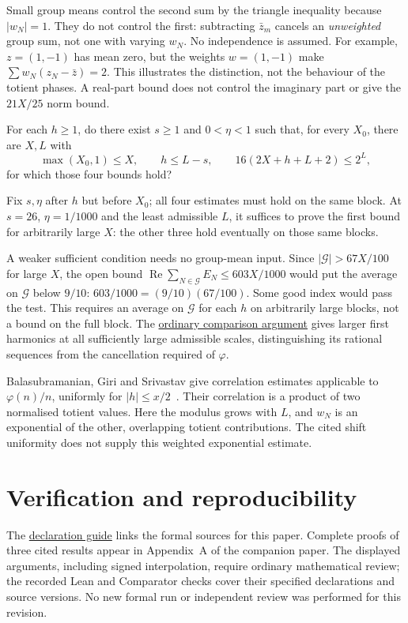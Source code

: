 \documentclass[11pt]{article}
\newcommand{\longrecord}[2]{\href{erdos249-totient-reasoning-surface.pdf\##1}{#2}}
\begin{document}
Small group means control the second sum by the triangle inequality
because $|w_N|=1$. They do not control the first: subtracting
$\bar z_m$ cancels an \emph{unweighted} group sum, not one with
varying $w_N$. No independence is assumed.
For example, $z=(1,-1)$ has mean zero, but the weights
$w=(1,-1)$ make $\sum w_N(z_N-\bar z)=2$.
This illustrates the distinction, not the behaviour of the totient phases.
A real-part bound does not control the imaginary part or give the
$21X/25$ norm bound.

\begin{problem}
\label{prob:firstharmonic}
For each $h\ge1$, do there exist $s\ge1$ and $0<\eta<1$ such that, for every
$X_0$, there are $X,L$ with
\[
 \max(X_0,1)\le X,\qquad h\le L-s,\qquad
 16(2X+h+L+2)\le2^L,
\]
for which those four bounds hold?
\end{problem}

Fix $s,\eta$ after $h$ but before $X_0$; all four estimates must hold
on the same block. At $s=26$, $\eta=1/1000$ and the least admissible
$L$, it suffices to prove the first bound for arbitrarily large $X$:
the other three hold eventually on those same blocks.

A weaker sufficient condition needs no group-mean input.
Since $|\mathcal G|>67X/100$ for large $X$, the open bound
$\operatorname{Re}\sum_{N\in\mathcal G}E_N\le603X/1000$
would put the average on $\mathcal G$ below $9/10$:
$603/1000=(9/10)(67/100)$. Some good index would pass the test.
This requires an average on $\mathcal G$ for each $h$ on arbitrarily
large blocks, not a bound on the full block.
The \longrecord{long249-r3-interpolation}{ordinary comparison argument}
gives larger first harmonics at all sufficiently large admissible scales,
distinguishing its rational sequences from the cancellation required of
$\varphi$.

Balasubramanian, Giri and Srivastav give correlation estimates applicable
to $\varphi(n)/n$, uniformly for $|h|\le x/2$~\cite[Thm.~2.2]{bgs2016}.
Their correlation is a product of two normalised totient values.
Here the modulus grows with $L$, and $w_N$ is an exponential of the
other, overlapping totient contributions. The cited shift uniformity
does not supply this weighted exponential estimate.

\section*{Verification and reproducibility}
\evidenceparagraph{\evidencerecordurl}
The \longrecord{long249-r3-declarations}{declaration guide} links the
formal sources for this paper. Complete proofs of three cited results
appear in Appendix~A of the companion paper. The displayed arguments,
including signed interpolation, require ordinary mathematical review;
the recorded Lean and Comparator checks cover their specified
declarations and source versions. No new formal run or independent
review was performed for this revision.
\end{document}
